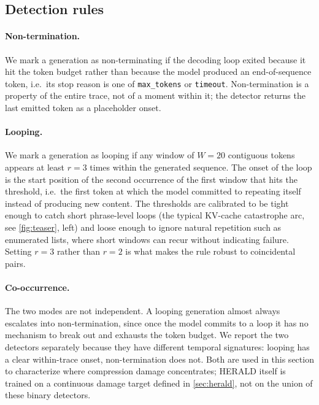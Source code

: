 \documentclass[11pt,a4paper]{article}
\begin{document}
\subsection{Detection rules}
\label{sec:failures:detection}

\paragraph{Non-termination.} We mark a generation as non-terminating if the decoding loop exited because it hit the token budget rather than because the model produced an end-of-sequence token, i.e.\ its stop reason is one of \texttt{max\_tokens} or \texttt{timeout}. Non-termination is a property of the entire trace, not of a moment within it; the detector returns the last emitted token as a placeholder onset.

\paragraph{Looping.} We mark a generation as looping if any window of $W = 20$ contiguous tokens appears at least $r = 3$ times within the generated sequence. The onset of the loop is the start position of the second occurrence of the first window that hits the threshold, i.e.\ the first token at which the model committed to repeating itself instead of producing new content. The thresholds are calibrated to be tight enough to catch short phrase-level loops (the typical KV-cache catastrophe arc, see \cref{fig:teaser}, left) and loose enough to ignore natural repetition such as enumerated lists, where short windows can recur without indicating failure. Setting $r = 3$ rather than $r = 2$ is what makes the rule robust to coincidental pairs.

\paragraph{Co-occurrence.} The two modes are not independent. A looping generation almost always escalates into non-termination, since once the model commits to a loop it has no mechanism to break out and exhausts the token budget. We report the two detectors separately because they have different temporal signatures: looping has a clear within-trace onset, non-termination does not. Both are used in this section to characterize where compression damage concentrates; HERALD itself is trained on a continuous damage target defined in \cref{sec:herald}, not on the union of these binary detectors.
\end{document}
